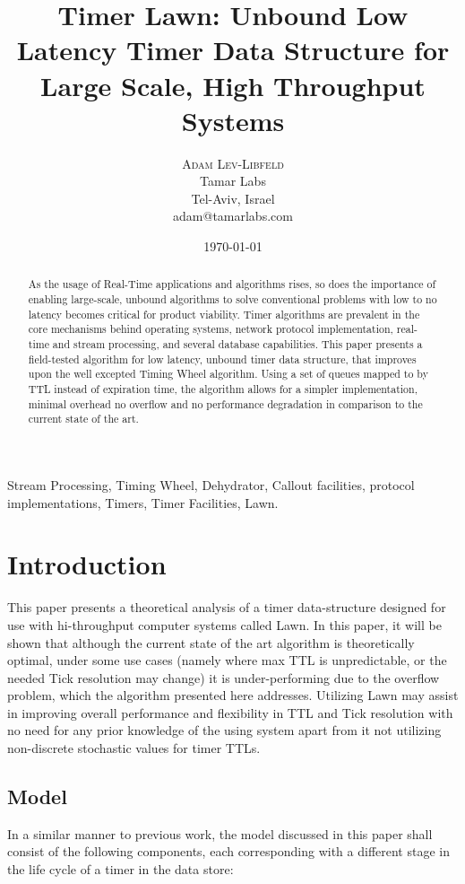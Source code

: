 \documentclass[conference]{IEEEtran}
\title{Timer Lawn: Unbound Low Latency Timer Data Structure for Large Scale, High Throughput Systems}
\author{
	\textsc{Adam Lev-Libfeld} \\[1ex]
	\normalsize Tamar Labs \\
	\normalsize Tel-Aviv, Israel \\
	\normalsize{adam@tamarlabs.com}
}
\date{\today}
\begin{document}
\maketitle

\begin{abstract}
As the usage of Real-Time applications and algorithms rises, so does the importance of enabling large-scale, unbound algorithms to solve conventional problems with low to no latency becomes critical for product viability\cite{REND, WHT}. Timer algorithms are prevalent in the core mechanisms behind operating systems\cite{BSD}, network protocol implementation, real-time and stream processing, and several database capabilities. This paper presents a field-tested algorithm for low latency, unbound timer data structure, that improves upon the well excepted Timing Wheel algorithm. Using a set of queues mapped to by TTL instead of expiration time, the algorithm allows for a simpler implementation, minimal overhead no overflow and no performance degradation in comparison to the current state of the art.
\end{abstract}

\begin{IEEEkeywords}
Stream Processing, Timing Wheel, Dehydrator, Callout facilities, protocol implementations, Timers, Timer Facilities, Lawn.
\end{IEEEkeywords}

\section{Introduction}
This paper presents a theoretical analysis of a timer data-structure designed for use with hi-throughput computer systems called Lawn. In this paper, it will be shown that although the current state of the art algorithm is theoretically optimal, under some use cases (namely where max TTL is unpredictable, or the needed Tick resolution may change) it is under-performing due to the overflow problem, which the algorithm presented here addresses. Utilizing Lawn may assist in improving overall performance and flexibility in TTL and Tick resolution with no need for any prior knowledge of the using system apart from it not utilizing non-discrete stochastic values for timer TTLs.
\subsection{Model}
In a similar manner to previous work\cite{TW, CQ, EMP}, the model discussed in this paper shall consist of the following components, each corresponding with a different stage in the life cycle of a timer in the data store:
\end{document}
